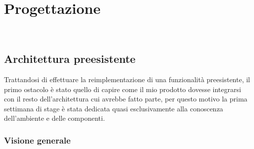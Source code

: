 
\chapter{Progettazione}
\label{cap:progettazione}

\\ %

\section{Architettura preesistente}
Trattandosi di effettuare la reimplementazione di una funzionalità preesistente, il primo ostacolo è stato quello di capire come il mio prodotto dovesse integrarsi con il resto dell'architettura cui avrebbe fatto parte, per questo motivo la prima settimana di stage è stata dedicata quasi esclusivamente alla conoscenza dell'ambiente e delle componenti. \\

\subsection{Visione generale}


